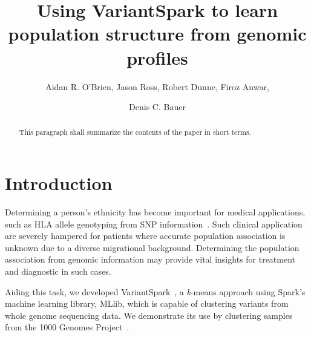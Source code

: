 \documentclass{llncs}
\newcommand{\variantSpark}{{\sc VariantSpark}}
\newcommand{\kMeans}{\textit{k}-means}
\begin{document}
\setcounter{save}{\value{section}}
{\def\addtocontents#1#2{}%
\def\addcontentsline#1#2#3{}%
\def\markboth#1#2{}%
%
\title{Using VariantSpark to learn population structure from genomic profiles}

\author{Aidan R. O'Brien, Jason Ross, Robert Dunne, Firoz Anwar, \and Denis C. Bauer}


\maketitle
%
\begin{abstract}
This paragraph shall summarize the contents of the paper
in short terms.
\end{abstract}
%
\section{Introduction}
%


Determining a person's ethnicity has become important for medical applications, such as HLA allele genotyping from SNP
information~\cite{Zheng2014}. Such clinical application are severely hampered for patients where accurate population
association is unknown due to a diverse migrational background. Determining the population association from genomic
information may provide vital insights for treatment and diagnostic in such cases.

Aiding this task, we developed \variantSpark~\cite{OBrien}, a \kMeans{} approach using {\sc Spark}'s machine learning
library, {\sc MLlib}, which is capable of clustering variants from whole genome sequencing data.  We demonstrate its use
by clustering samples from the 1000 Genomes Project~\cite{1KG2012}.  

}
\end{document}
